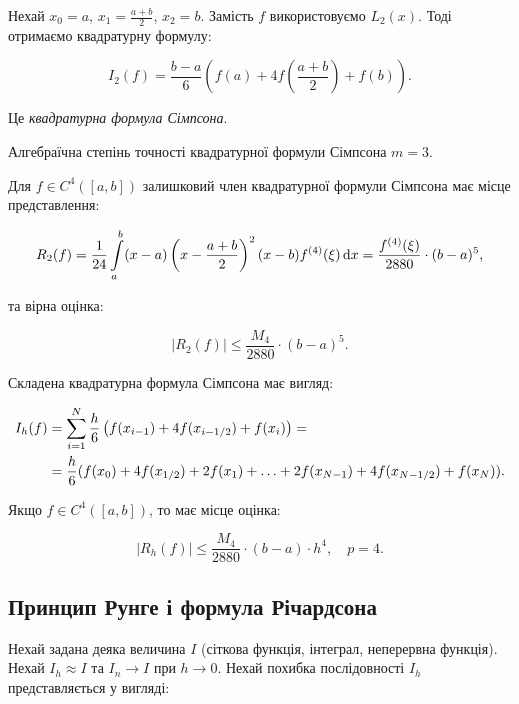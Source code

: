 Нехай $x_0 = a$, $x_1 = \frac{a + b}{2}$, $x_2 = b$. Замість $f$ використовуємо $L_2(x)$. Тоді отримаємо квадратурну формулу:

\begin{equation}
	I_2(f) = \frac{b - a}{6} \left( f(a) + 4 f \left( \frac{a + b}{2} \right) + f(b) \right).
\end{equation}

Це \textit{квадратурна формула Сімпсона}. \medskip

Алгебраїчна степінь точності квадратурної формули Сімпсона $m = 3$. \medskip

Для $f \in C^4([a,b])$ залишковий член квадратурної формули Сімпсона має місце представлення:

\begin{equation}
	R_2(f) = \frac{1}{24} \displaystyle\int\limits_a^b (x - a) \left( x - \frac{a + b}{2} \right)^2 (x - b) f^{(4)}(\xi) \mathop{}\!\mathrm{d} x = \frac{f^{(4)}(\xi)}{2880} \cdot (b - a)^5,
\end{equation}

та вірна оцінка:

\begin{equation}
	|R_2(f)| \le \frac{M_4}{2880} \cdot (b - a)^5.
\end{equation}

Складена квадратурна формула Сімпсона має вигляд:

\begin{equation}
	\begin{aligned}
		I_h(f) &= \displaystyle\sum\limits_{i = 1}^N \frac{h}{6} \left( f(x_{i - 1}) + 4 f (x_{i - 1/2}) + f(x_i) \right) = \\
		&= \frac{h}{6} ( f(x_0) + 4 f(x_{1/2}) + 2 f(x_1) + \ldots + 2 f(x_{N - 1}) + 4 f(x_{N-1/2}) + f(x_N) ).
	\end{aligned}
\end{equation}

Якщо $f \in C^4([a,b])$, то має місце оцінка:

\begin{equation}
	|R_h(f)| \le \frac{M_4}{2880} \cdot (b - a) \cdot h^4, \quad p = 4.
\end{equation}

\subsection{Принцип Рунге і формула Річардсона}

Нехай задана деяка величина $I$ (сіткова функція, інтеграл, неперервна функція). Нехай $I_h \approx I$ та $I_n \to I$ при $h \to 0$. Нехай похибка послідовності $I_h$ представляється у вигляді:

